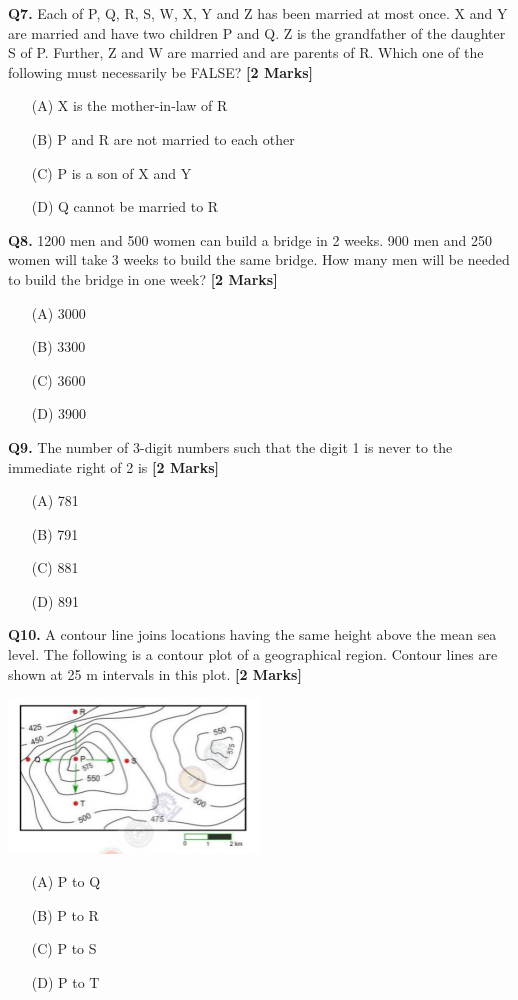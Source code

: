 \documentclass[11pt]{article}
\newcommand{\questionb}[2]{
    \noindent\textbf{Q#2.} #1 \hfill \textbf{[2 Marks]}
}
\begin{document}
\questionb{Each of P, Q, R, S, W, X, Y and Z has been married at most once. X and Y are married and have two children P and Q. Z is the grandfather of the daughter S of P. Further, Z and W are married and are parents of R. Which one of the following must necessarily be FALSE?}{7}
\begin{enumerate}
    \item[(A)] X is the mother-in-law of R  
    \item[(B)] P and R are not married to each other  
    \item[(C)] P is a son of X and Y  
    \item[(D)] Q cannot be married to R  
\end{enumerate}
\vspace{0.5cm}

\questionb{1200 men and 500 women can build a bridge in 2 weeks. 900 men and 250 women will take 3 weeks to build the same bridge. How many men will be needed to build the bridge in one week?}{8}
\begin{enumerate}
    \item[(A)] 3000  
    \item[(B)] 3300  
    \item[(C)] 3600  
    \item[(D)] 3900  
\end{enumerate}
\vspace{0.5cm}

\questionb{The number of 3-digit numbers such that the digit 1 is never to the immediate right of 2 is}{9}
\begin{enumerate}
    \item[(A)] 781  
    \item[(B)] 791  
    \item[(C)] 881  
    \item[(D)] 891  
\end{enumerate}
\vspace{0.5cm}

\questionb{A contour line joins locations having the same height above the mean sea level. The following is a contour plot of a geographical region. Contour lines are shown at 25 m intervals in this plot.}{10}
\begin{center}
\includegraphics[width=0.5\textwidth]{figures/10.png}
\end{center}
\begin{enumerate}
    \item[(A)] P to Q  
    \item[(B)] P to R  
    \item[(C)] P to S  
    \item[(D)] P to T  
\end{enumerate}
\vspace{0.5cm}
\end{document}
